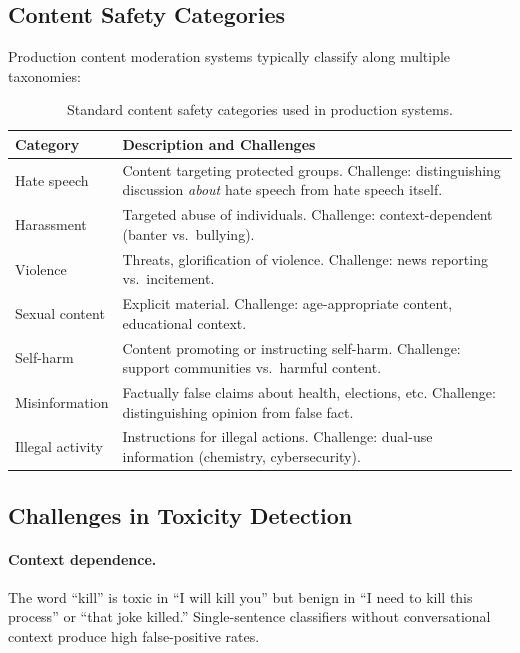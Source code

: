 \subsection{Content Safety Categories}

Production content moderation systems typically classify along multiple
taxonomies:

\begin{table}[H]
\centering
\caption{Standard content safety categories used in production systems.}
\label{tab:safety_categories}
\begin{tabularx}{\textwidth}{l X}
\toprule
\textbf{Category} & \textbf{Description and Challenges} \\
\midrule
Hate speech & Content targeting protected groups.  Challenge: distinguishing
    discussion \emph{about} hate speech from hate speech itself. \\
Harassment & Targeted abuse of individuals.  Challenge: context-dependent
    (banter vs.\ bullying). \\
Violence & Threats, glorification of violence.  Challenge: news reporting
    vs.\ incitement. \\
Sexual content & Explicit material.  Challenge: age-appropriate content,
    educational context. \\
Self-harm & Content promoting or instructing self-harm.  Challenge: support
    communities vs.\ harmful content. \\
Misinformation & Factually false claims about health, elections, etc.
    Challenge: distinguishing opinion from false fact. \\
Illegal activity & Instructions for illegal actions.  Challenge: dual-use
    information (chemistry, cybersecurity). \\
\bottomrule
\end{tabularx}
\end{table}

\subsection{Challenges in Toxicity Detection}

\paragraph{Context dependence.}
The word ``kill'' is toxic in ``I will kill you'' but benign in ``I need to
kill this process'' or ``that joke killed.''  Single-sentence classifiers
without conversational context produce high false-positive rates.

